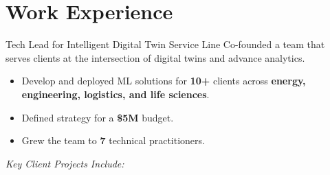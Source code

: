 \documentclass[a4paper]{deedy-resume} %
\begin{document}
\section{Work Experience}
\vspace{-5pt}
\begin{callout}{Tech Lead for Intelligent Digital Twin Service Line}
\linebreak
    Co-founded a team that serves clients at the intersection of digital twins and advance analytics.
    \vspace{-10pt}
    \begin{multicols}{2}
        \begin{itemize}
            \item Develop and deployed ML solutions for \textbf{10+} clients across \textbf{energy, engineering, logistics, and life sciences}. 
            \item Defined strategy for a \textbf{\$5M} budget.
            \item Grew the team to \textbf{7} technical practitioners.
        \end{itemize}
    \end{multicols}
\end{callout}
\vspace{-2pt}
\textit{Key Client Projects Include:}
\vspace{-10pt}
\end{document}
